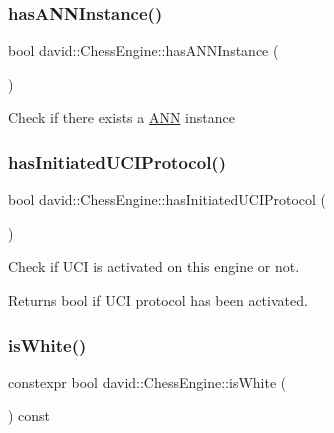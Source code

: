 \subsubsection{\texorpdfstring{has\+A\+N\+N\+Instance()}{hasANNInstance()}}
{\footnotesize\ttfamily bool david\+::\+Chess\+Engine\+::has\+A\+N\+N\+Instance (\begin{DoxyParamCaption}{ }\end{DoxyParamCaption})}

Check if there exists a \hyperlink{classdavid_1_1ANN}{A\+NN} instance \mbox{\label{classdavid_1_1ChessEngine_a0783753d3e0678d053d28d509b4170cb}} 
\subsubsection{\texorpdfstring{has\+Initiated\+U\+C\+I\+Protocol()}{hasInitiatedUCIProtocol()}}
{\footnotesize\ttfamily bool david\+::\+Chess\+Engine\+::has\+Initiated\+U\+C\+I\+Protocol (\begin{DoxyParamCaption}{ }\end{DoxyParamCaption})}

Check if U\+CI is activated on this engine or not.

\begin{DoxyReturn}{Returns}
bool if U\+CI protocol has been activated. 
\end{DoxyReturn}
\mbox{\label{classdavid_1_1ChessEngine_aad68f52fc4118e10b932b35117062ad2}} 
\subsubsection{\texorpdfstring{is\+White()}{isWhite()}}
{\footnotesize\ttfamily constexpr bool david\+::\+Chess\+Engine\+::is\+White (\begin{DoxyParamCaption}{ }\end{DoxyParamCaption}) const\hspace{0.3cm}{\ttfamily [inline]}}


